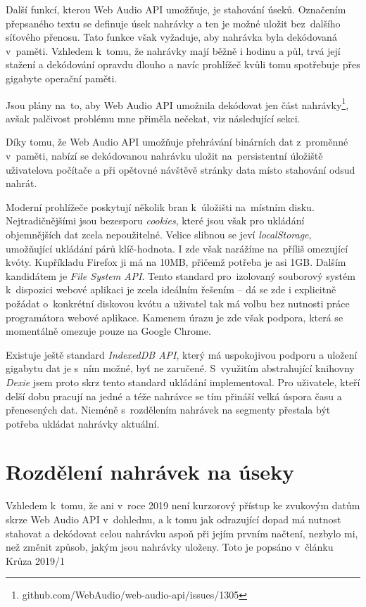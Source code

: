 Další funkcí, kterou Web Audio API umožňuje, je stahování úseků. Označením
přepsaného textu se definuje úsek nahrávky a ten je možné uložit bez~dalšího
síťového přenosu. Tato funkce však vyžaduje, aby nahrávka byla dekódovaná
v~paměti. Vzhledem k~tomu, že nahrávky mají běžně i hodinu a půl, trvá její
stažení a dekódování opravdu dlouho a navíc prohlížeč kvůli tomu spotřebuje přes
gigabyte operační paměti.

Jsou plány na~to, aby Web Audio API umožnila dekódovat jen část
nahrávky\footnote{github.com/WebAudio/web-audio-api/issues/1305}, avšak
palčivost problému mne přiměla nečekat, viz následující sekci.

Díky tomu, že Web Audio API umožňuje přehrávání binárních dat z~proměnné
v~paměti, nabízí se dekódovanou nahrávku uložit na~persistentní úložiště
uživatelova počítače a při opětovné návštěvě stránky data místo stahování odsud
nahrát.

Moderní prohlížeče poskytují několik bran k~úložišti na~místním disku.
Nejtradičnějšími jsou bezesporu \textit{cookies}, které jsou však pro ukládání
objemnějších dat zcela nepoužitelné. Velice slibnou se jeví
\textit{localStorage}, umožňující ukládání párů klíč-hodnota. I zde však
narážíme na~příliš omezující kvóty. Kupříkladu Firefox ji má na 10MB, přičemž
potřeba je asi 1GB. Dalším kandidátem je \textit{File System API}. Tento
standard pro~izolovaný souborový systém k~dispozici webové aplikaci je zcela
ideálním řešením -- dá se zde i explicitně požádat o~konkrétní diskovou kvótu a
uživatel tak má volbu bez nutnosti práce programátora webové aplikace. Kamenem
úrazu je zde však podpora, která se momentálně omezuje pouze na Google Chrome.

Existuje ještě standard \textit{IndexedDB API}, který má uspokojivou
podporu a uložení gigabytu dat je s~ním možné, byť ne zaručené. S~využitím
abstrahující knihovny \textit{Dexie} jsem proto skrz tento standard ukládání
implementoval. Pro uživatele, kteří delší dobu pracují na jedné a téže nahrávce
se tím přináší velká úspora času a přenesených dat. Nicméně s~rozdělením
nahrávek na segmenty přestala být potřeba ukládat nahrávky aktuální.

\section{Rozdělení nahrávek na úseky}
\label{sec:segmenty}

Vzhledem k~tomu, že ani v~roce 2019 není kurzorový přístup ke zvukovým datům
skrze Web Audio API v~dohlednu, a k tomu jak odrazující dopad má nutnost
stahovat a dekódovat celou nahrávku aspoň při jejím prvním načtení, nezbylo mi,
než změnit způsob, jakým jsou nahrávky uloženy. Toto je popsáno v~článku Krůza 2019/1\cite{kruza2019restructuring}

